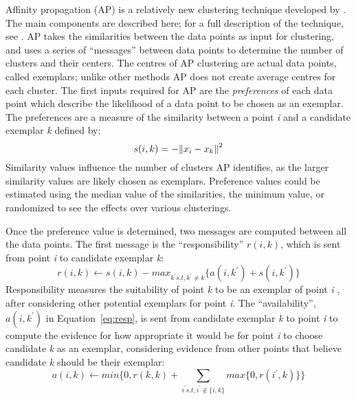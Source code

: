 Affinity propagation (AP) is a relatively new clustering technique developed by \citet{frey07}.
The main components are described here; for a full description of the technique, see \citet{frey07}.
AP takes the similarities between the data points as input for clustering, and uses a series of ``messages'' between data points to determine the number of clusters and their centers.
The centres of AP clustering are actual data points, called exemplars; unlike other methods AP does not create average centres for each cluster. 
The first inputs required for AP are the \textit{preferences} of each data point which describe the likelihood of a data point to be chosen as an exemplar.
The preferences are a measure of the similarity between a point \textit{i} and a candidate exemplar \textit{k} defined by: 
\begin{equation}
\label{eq:sim}
s(i,k) = -\norm{x_i - x_k}^2
\end{equation}
Similarity values influence the number of clusters AP identifies, as the larger similarity values are likely chosen as exemplars.
Preference values could be estimated using the median value of the similarities, the minimum value, or randomized to see the effects over various clusterings.

Once the preference value is determined, two messages are computed between all the data points.
The first message is the ``responsibility'' $r(i,k)$, which is sent from point \textit{i} to candidate exemplar \textit{k}:
\begin{equation}
\label{eq:resp}
r(i,k) \leftarrow s(i,k) - max_{k^\prime s.t,  k^\prime \neq k} \{ a(i,k^\prime) + s(i,k^\prime) \}
\end{equation}
Responsibility measures the suitability of point \textit{k} to be an exemplar of point \textit{i} \citet{frey07}, after considering other potential exemplars for point \textit{i}.
The ``availability'', $a(i,k^\prime)$ in Equation~\ref{eq:resp}, is sent from candidate exemplar \textit{k} to point \textit{i} to compute the evidence for how appropriate it would be for point \textit{i} to choose candidate \textit{k} as an exemplar, considering evidence from other points that believe candidate \textit{k} should be their exemplar: %
\begin{equation}
\label{eq:avail}
a(i,k) \leftarrow min\Big\{ 0, r(k,k) + \sum\limits_{i^\prime s.t, i^\prime \notin \{i,k\}} max\{0, r(i^\prime, k)\}\Big\}
\end{equation}

